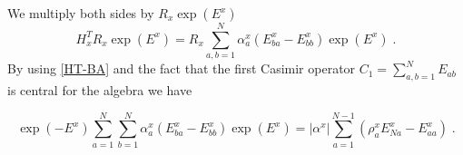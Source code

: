 \documentclass[10pt]{article}
\numberwithin{equation}{section}
\numberwithin{equation}{subsection}
\newcommand{\dt}{\;.}
\begin{document}
We multiply both sides by $R_{x}\exp{(E^{x})}$
\begin{equation}\label{intermediateTransposeSite}
    H_{x}^{T}R_{x}\exp{(E^{x})}=R_{x}\sum_{a,b =1}^{N}\alpha_{a}^{x}\left(E_{b a}^{x}-E_{bb}^{x}\right)\exp{(E^{x})}\dt
\end{equation}
By using \eqref{HT-BA} and the fact that the first Casimir operator $C_{1}=\sum_{a,b=1}^{N}E_{ab}$ is central for the algebra we have 
\begin{comment}
then, in the right hand side
\begin{equation}\label{intermediateTransposeSite}
H_{x}^{T}R_{x}\exp{(E^{x})}=R_{x}\exp{(E^{x})}\exp{(-E^{x})}\sum_{a,b=1}^{N}\alpha_{a}^{x}\left(E_{b a}^{x}-E_{bb}^{x}\right)\exp{(E^{x})}
\end{equation}
\end{comment}
 \begin{comment}
 \eqref{HT_El1}, \eqref{HT_Ell},\eqref{HT-E1l}, \eqref{HT-Ekl}, \eqref{HT-E11} we have that 
\begin{align}
    &\exp{(-E^{x})}\sum_{a=1}^{N}\sum_{b=1}^{N}\alpha_{a}^{x}\left(E_{b a}^{x}-E_{bb}^{x}\right)\exp{(E^{x})}\nonumber
    \\&=\nonumber
    \sum_{a=2}^{N}\alpha_{a}^{x}\left(E_{Na}^{x}+E_{NN}^{x}-\sum_{c=1}^{N-1}(E_{cN}^{x})-\sum_{c=1}^{N-1}(E_{ca}^{x})-E_{NN}^{x}+
    \sum_{c=2}^{N}(E_{cN}^{x})\right)
    \\&+\nonumber
    \alpha_{N}^{x}\sum_{b=1}^{N-1}\left(E_{bN}^{x}-E_{bb}^{x}-E_{bN}^{x}\right)+\sum_{a=1}^{N-1}\sum_{b=1}^{N-1}\alpha_{a}^{x}\left(E_{ba}^{x}+E_{bN}^{x}-E_{bb}^{x}-E_{bN}^{x}\right)
    \\&=\nonumber
    \sum_{a=1}^{N-1}\alpha_{a}^{x}E_{Na}^{x}-|\alpha^{x}|\sum_{b=1}^{N-1}E_{bb}^{x}=
    \sum_{a=1}^{N-1}\left(\alpha_{a}^{x}E_{Na}^{x}-|\alpha^{x}|E_{aa}^{x}\right)
    \\&=\nonumber
    |\alpha^{x}|\sum_{a=1}^{N-1}\left(\frac{\alpha_{a}^{x}}{|\alpha^{x}|}E_{Na}^{x}-E_{aa}^{x}\right)
    \\&=
    |\alpha^{x}|\sum_{a=1}^{N-1}\left(\rho_{a}^{x}E_{Na}^{x}-E_{aa}^{x}\right)
 \end{align}
in short
\end{comment}
\begin{equation}\label{HadTransfBoundary}
\exp{(-E^{x})}\sum_{a=1}^{N}\sum_{b=1}^{N}\alpha_{a}^{x}\left(E_{b a}^{x}-E_{bb}^{x}\right)\exp{(E^{x})}=	|\alpha^{x}|\sum_{a=1}^{N-1}\left(\rho_{a}^{x}E_{Na}^{x}-E_{aa}^{x}\right)\dt
\end{equation}
\end{document}
